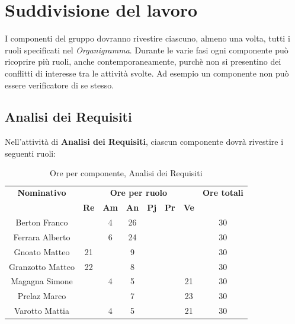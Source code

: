 \section{Suddivisione del lavoro}
I componenti del gruppo dovranno rivestire ciascuno, almeno una volta, tutti i ruoli specificati nel \textit{Organigramma}.
Durante le varie fasi ogni componente può ricoprire più ruoli, anche contemporaneamente, purchè non si presentino dei conflitti di interesse tra le attività svolte. Ad esempio un componente non può essere verificatore di se stesso.
\subsection{Analisi dei Requisiti}
Nell'attività di \textbf{Analisi dei Requisiti}, ciascun componente dovrà rivestire i seguenti ruoli:
\begin{table}[H]
	\begin{center}
		\begin{tabular}{|c|c|c|c|c|c|c|c|}
			\hline
			\textbf{Nominativo} & \multicolumn{6}{c|}{\textbf{Ore per ruolo}} & \textbf{Ore totali} \\
			& \textbf{Re} & \textbf{Am} & \textbf{An} & \textbf{Pj} & \textbf{Pr} & \textbf{Ve} & \\
			\hline
			Berton Franco		&		&	4	&	26	&		&		&		&	30	\\
			\hline
			Ferrara Alberto		&		&	6	&	24	&	 	&		&		& 	30	\\
			\hline
			Gnoato Matteo		&	21	&		&	9	&		&		&		&	30	\\
			\hline						
			Granzotto Matteo	&	22	&	 	&	8 	&		&	 	& 		&	30	\\
			\hline
			Magagna Simone 		&		&	4	&	5	&		&		& 	21	&	30	\\
			\hline
			Prelaz Marco 		& 		&		&	7	&		&		&	23	&	30	\\
			\hline						
			Varotto Mattia 		&		&	4	&	5	&		&		&	21	& 	30	\\
			\hline
		\end{tabular}
	\end{center}
	\caption{Ore per componente, Analisi dei Requisiti}
\end{table}

